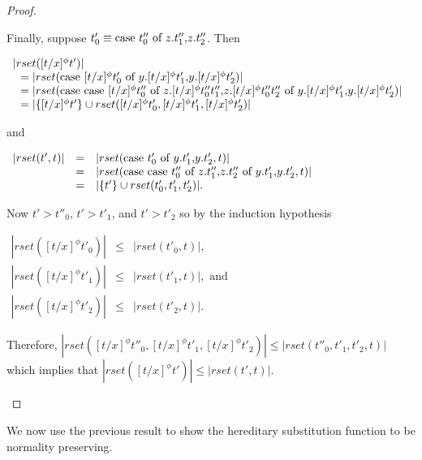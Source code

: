 \begin{proof}
\begin{itemize}
  Finally, suppose $t'_0 \equiv \mbox{case}\ t''_0\ \text{of}\ z\text{.}t''_1\text{,}z\text{.}t''_2$.  Then 
  \begin{center}
    \begin{math}
      \begin{array}{lll}
        |rset([t/x]^\phi t')| \\
        \,\,\,\,= |rset(\mbox{case}\ [t/x]^\phi t'_0\ \text{of}\ y\text{.}[t/x]^\phi t'_1\text{,}y\text{.}[t/x]^\phi t'_2)|\\
        \,\,\,\,= |rset(\mbox{case}\ \mbox{case}\ [t/x]^\phi t''_0\ \text{of}\ z\text{.}[t/x]^\phi t''_0 t''_1\text{,}z\text{.}[t/x]^\phi t''_0 t''_2\ \text{of}\ y\text{.}[t/x]^\phi t'_1\text{,}y\text{.}[t/x]^\phi t'_2)|\\
        \,\,\,\,= |\{[t/x]^\phi t'\} \cup rset([t/x]^\phi t'_0, [t/x]^\phi t'_1, [t/x]^\phi t'_2)|
      \end{array}
    \end{math}
  \end{center}
  and
  \begin{center}
    \begin{math}
      \begin{array}{lll}
        |rset(t',t)| & = & |rset(\mbox{case}\ t'_0\ \text{of}\ y\text{.}t'_1\text{,}y\text{.}t'_2,t)|\\
        & = & |rset(\mbox{case}\ \mbox{case}\ t''_0\ \text{of}\ z\text{.}t''_1\text{,}z\text{.}t''_2\ \text{of}\ y\text{.}t'_1\text{,}y\text{.}t'_2,t)|\\
        & = & |\{t'\} \cup rset(t'_0, t'_1,t'_2)|.
      \end{array}
    \end{math}
  \end{center}
  Now $t' > t''_0$, $t' > t'_1$, and $t' > t'_2$ so by the induction hypothesis
  \begin{center}
    \begin{math}
      \begin{array}{lll}
        |rset([t/x]^\phi t'_0)| & \leq & |rset(t'_0,t)|,\\
        |rset([t/x]^\phi t'_1)|  & \leq & |rset(t'_1,t)|, \text{ and }\\
        |rset([t/x]^\phi t'_2)|  & \leq & |rset(t'_2,t)|.
      \end{array}
    \end{math}
  \end{center}
  Therefore, $|rset([t/x]^\phi t''_0, [t/x]^\phi t'_1, [t/x]^\phi t'_2)| \leq |rset(t''_0, t'_1, t'_2, t)|$
  which implies that $|rset([t/x]^\phi t')| \leq |rset(t',t)|$.  
\end{itemize}
\end{proof}
\noindent
We now use the previous result to show the hereditary substitution
function to be normality preserving.
